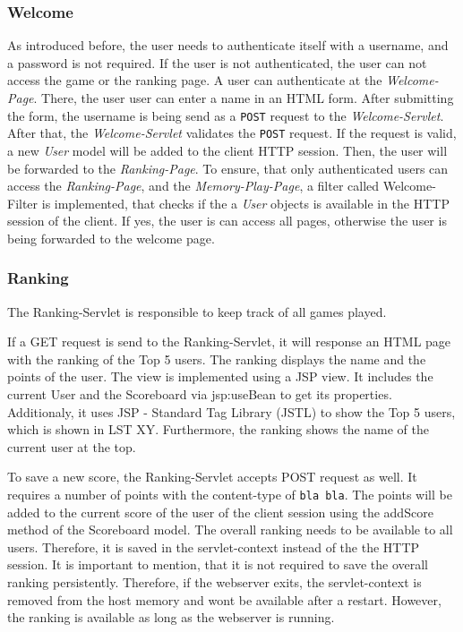 \subsubsection{Welcome}\label{subsubsec:03_impl_backend_welcome}
As introduced before, the user needs to authenticate itself with a username, and a password is not required. If the user is not authenticated, the user can not access the game or the ranking page.
A user can authenticate at the \textit{Welcome-Page}. There, the user user can enter a name in an HTML form. After submitting the form, the username is being send as a \texttt{POST} request to the \textit{Welcome-Servlet}. After that, the \textit{Welcome-Servlet} validates the \texttt{POST} request. If the request is valid, a new \textit{User} model will be added to the client HTTP session. Then, the user will be forwarded to the \textit{Ranking-Page}.
To ensure, that only authenticated users can access the \textit{Ranking-Page}, and the \textit{Memory-Play-Page}, a filter called Welcome-Filter is implemented, that checks if the a \textit{User} objects is available in the HTTP session of the client. If yes, the user is can access all pages, otherwise the user is being forwarded to the welcome page.

\subsubsection{Ranking}\label{subsubsec:03_impl_backend_ranking}
The Ranking-Servlet is responsible to keep track of all games played.

If a GET request is send to the Ranking-Servlet, it will response an HTML page with the ranking of the Top 5 users. The ranking displays the name and the points of the user.
The view is implemented using a JSP view. It includes the current User and the Scoreboard via jsp:useBean to get its properties.
Additionaly, it uses JSP - Standard Tag Library (JSTL) to show the Top 5 users, which is shown in LST XY. Furthermore, the ranking shows the name of the current user at the top.


To save a new score, the Ranking-Servlet accepts POST request as well. It requires a number of points with the content-type of \texttt{bla bla}.
The points will be added to the current score of the user of the client session using the addScore method of the Scoreboard model.
The overall ranking needs to be available to all users. Therefore, it is saved in the servlet-context instead of the the HTTP session.
It is important to mention, that it is not required to save the overall ranking persistently. Therefore, if the webserver exits, the servlet-context is removed from the host memory and wont be available after a restart. However, the ranking is available as long as the webserver is running.

